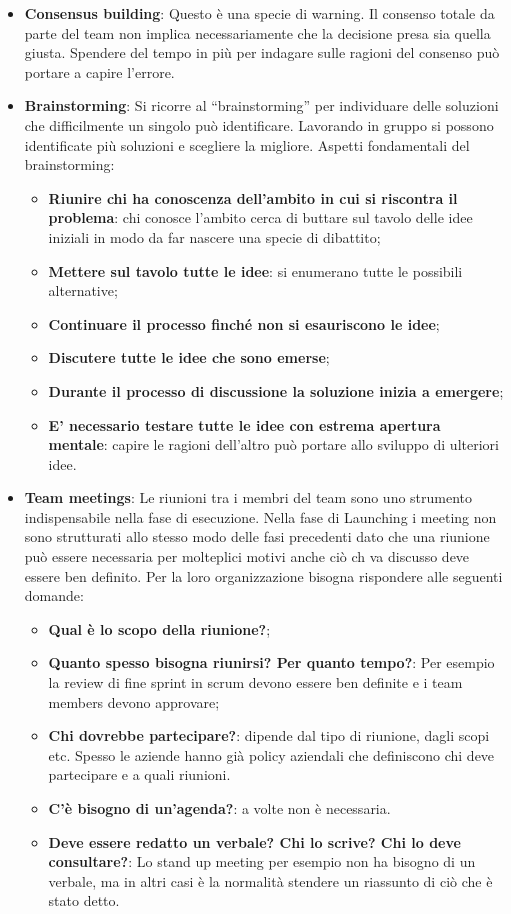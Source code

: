 \begin{itemize}
\begin{itemize}
	\end{itemize}
	\item \textbf{Consensus building}: Questo è una specie di warning. Il consenso totale da parte del team non implica necessariamente che la decisione presa sia quella giusta. Spendere del tempo in più per indagare sulle ragioni del consenso può portare a capire l'errore.
	\item \textbf{Brainstorming}: Si ricorre al “brainstorming” per individuare delle soluzioni che difficilmente un singolo può identificare. Lavorando in gruppo si possono identificate più soluzioni e scegliere la migliore. Aspetti fondamentali del brainstorming:
	\begin{itemize}
		\item \textbf{Riunire chi ha conoscenza dell’ambito in cui si riscontra il problema}: chi conosce l'ambito cerca di buttare sul tavolo delle idee iniziali in modo da far nascere una specie di dibattito;
		\item \textbf{Mettere sul tavolo tutte le idee}: si enumerano tutte le possibili alternative;
		\item \textbf{Continuare il processo finché non si esauriscono le idee};
		\item \textbf{Discutere tutte le idee che sono emerse};
		\item \textbf{Durante il processo di discussione la soluzione inizia a emergere};
		\item \textbf{E’ necessario testare tutte le idee con estrema apertura mentale}: capire le ragioni dell'altro può portare allo sviluppo di ulteriori idee.
	\end{itemize}
	\item \textbf{Team meetings}: Le riunioni tra i membri del team sono uno strumento indispensabile nella fase di esecuzione. Nella fase di Launching i meeting non sono strutturati allo stesso modo delle fasi precedenti dato che una riunione può essere necessaria per molteplici motivi anche ciò ch va discusso deve essere ben definito. Per la loro organizzazione bisogna rispondere alle seguenti domande:
	\begin{itemize}
		\item \textbf{Qual è lo scopo della riunione?};
		\item \textbf{Quanto spesso bisogna riunirsi? Per quanto tempo?}: Per esempio la review di fine sprint in scrum devono essere ben definite e i team members devono approvare;
		\item \textbf{Chi dovrebbe partecipare?}: dipende dal tipo di riunione, dagli scopi etc. Spesso le aziende hanno già policy aziendali che definiscono chi deve partecipare e a quali riunioni.
		\item \textbf{C’è bisogno di un’agenda?}: a volte non è necessaria.
		\item \textbf{Deve essere redatto un verbale? Chi lo scrive? Chi lo deve consultare?}: Lo stand up meeting per esempio non ha bisogno di un verbale, ma in altri casi è la normalità stendere un riassunto di ciò che è stato detto.
	\end{itemize}
\end{itemize}
